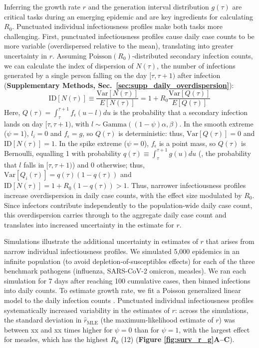 Inferring the growth rate $r$ and the generation interval distribution $g(\tau)$ are critical tasks during an emerging epidemic and are key ingredients for calculating $R_0$. Punctuated individual infectiousness profiles make both tasks more challenging. First, punctuated infectiousness profiles cause daily case counts to be more variable (overdispersed relative to the mean), translating into greater uncertainty in $r$. Assuming $\text{Poisson}(R_0)$-distributed secondary infection counts, we can calculate the index of dispersion of $N(\tau)$, the number of infections generated by a single person falling on the day $[\tau, \tau+1)$ after infection ({\bf Supplementary Methods, Sec.~\ref{sec:supp_daily_overdispersion}}): 
\begin{equation}
	\text{ID}[N(\tau)] \equiv \frac{\text{Var}[N(\tau)]}{E[N(\tau)]} = 1 + R_0 \frac{\text{Var}[Q(\tau)]}{E[Q(\tau)]}
\end{equation}
Here, $Q(\tau) = \int_\tau^{\tau+1} f_\epsilon(u - l) du$ is the probability that a secondary infection lands on day $[\tau, \tau+1)$, with $l \sim \text{Gamma}((1-\psi)\alpha, \beta)$. In the smooth extreme ($\psi = 1$), $l_i = 0$ and $f_\epsilon = g$, so $Q(\tau)$ is deterministic: thus, $\text{Var}[Q(\tau)] = 0$ and $\text{ID}[N(\tau)] = 1$. In the spike extreme ($\psi = 0$), $f_\epsilon$ is a point mass, so $Q(\tau)$ is Bernoulli, equalling 1 with probability $q(\tau) \equiv \int_\tau^{\tau + 1} g(u) du$ (\ie, the probability that $l$ falls in $[\tau, \tau+1)$) and 0 otherwise; thus, $\text{Var}[Q_i(\tau)] = q(\tau) (1 - q(\tau))$ and $\text{ID}[N(\tau)] = 1 + R_0 (1 - q(\tau)) > 1$. Thus, narrower infectiousness profiles increase overdispersion in daily case counts, with the effect size modulated by $R_0$. Since infectors contribute independently to the population-wide daily case count, this overdispersion carries through to the aggregate daily case count and translates into increased uncertainty in the estimate for $r$. 

Simulations illustrate the additional uncertainty in estimates of $r$ that arises from narrow individual infectiousness profiles. We simulated 5,000 epidemics in an infinite population (to avoid depletion-of-susceptibles effects) for each of the three benchmark pathogens (influenza, SARS-CoV-2 omicron, measles). We ran each simulation for 7 days after reaching 100 cumulative cases, then binned infections into daily counts. To estimate growth rate, we fit a Poisson generalized linear model to the daily infection counts \citep{}. Punctuated individual infectiousness profiles systematically increased variability in the estimates of $r$: across the simulations, the standard deviation in $\hat{r}_{\text{MLE}}$ (the maximum-likelihood estimate of $r$) was between xx and xx times higher for $\psi = 0$ than for $\psi = 1$, with the largest effect for measles, which has the highest $R_0$ (12) ({\bf Figure \ref{fig:surv_r_g}A--C}). 

